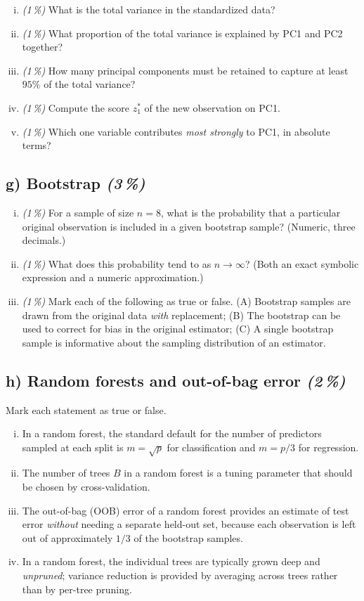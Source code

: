 \documentclass[11pt,a4paper]{article}
\newcommand{\subpoints}[1]{\textit{(#1\,\%)}}
\begin{document}
\begin{enumerate}[(i)]
  \item \subpoints{1} What is the total variance in the standardized data?
  \item \subpoints{1} What proportion of the total variance is explained by PC1 and PC2 together?
  \item \subpoints{1} How many principal components must be retained to capture at least $95\%$ of the total variance?
  \item \subpoints{1} Compute the score $z^*_1$ of the new observation on PC1.
  \item \subpoints{1} Which one variable contributes \emph{most strongly} to PC1, in absolute terms?
\end{enumerate}

\subsection*{g) Bootstrap \subpoints{3}}
\begin{enumerate}[(i)]
  \item \subpoints{1} For a sample of size $n=8$, what is the probability that a particular original observation is included in a given bootstrap sample? (Numeric, three decimals.)
  \item \subpoints{1} What does this probability tend to as $n \to \infty$? (Both an exact symbolic expression and a numeric approximation.)
  \item \subpoints{1} Mark each of the following as true or false. (A) Bootstrap samples are drawn from the original data \emph{with} replacement; (B) The bootstrap can be used to correct for bias in the original estimator; (C) A single bootstrap sample is informative about the sampling distribution of an estimator.
\end{enumerate}

\subsection*{h) Random forests and out-of-bag error \subpoints{2}}
Mark each statement as true or false.
\begin{enumerate}[(i)]
  \item In a random forest, the standard default for the number of predictors sampled at each split is $m = \sqrt{p}$ for classification and $m = p/3$ for regression.
  \item The number of trees $B$ in a random forest is a tuning parameter that should be chosen by cross-validation.
  \item The out-of-bag (OOB) error of a random forest provides an estimate of test error \emph{without} needing a separate held-out set, because each observation is left out of approximately $1/3$ of the bootstrap samples.
  \item In a random forest, the individual trees are typically grown deep and \emph{unpruned}; variance reduction is provided by averaging across trees rather than by per-tree pruning.
\end{enumerate}
\end{document}
